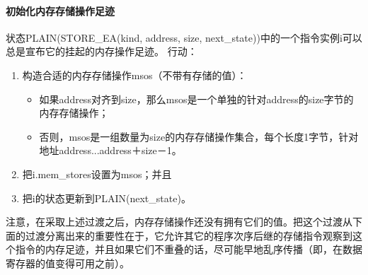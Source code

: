 \paragraph{初始化内存存储操作足迹}\label{omm:initiate_store_footprint}
状态PLAIN(STORE_EA(kind, address, size, next_state))中的一个指令实例i可以总是宣布它的挂起的内存操作足迹。
行动：
\begin{enumerate}
\item 构造合适的内存存储操作msos（不带有存储的值）： %
  \begin{itemize}
  \item 如果address对齐到size，那么msos是一个单独的针对address的size字节的内存存储操作； %
  \item 否则，msos是一组数量为size的内存存储操作集合，每个长度1字节，针对地址address...address＋size－1。  %
  \end{itemize}
\item 把i.mem_stores设置为msos；并且  %
\item 把i的状态更新到PLAIN(next_state)。  %
\end{enumerate}

\begin{commentary}
  注意，在采取上述过渡之后，内存存储操作还没有拥有它们的值。把这个过渡从下面的过渡分离出来的重要性在于，它允许其它的程序次序后继的存储指令观察到这个指令的内存足迹，并且如果它们不重叠的话，尽可能早地乱序传播（即，在数据寄存器的值变得可用之前）。
\end{commentary}


